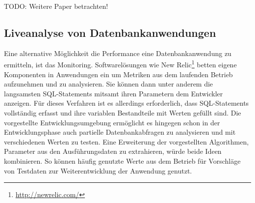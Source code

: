 TODO: Weitere Paper betrachten!

\subsection{Liveanalyse von Datenbankanwendungen}
Eine alternative Möglichkeit die Performance eine Datenbankanwendung zu ermitteln, ist das Monitoring.
Softwarelösungen wie New Relic\footnote{\url{http://newrelic.com/}} betten eigene Komponenten in Anwendungen ein um Metriken aus dem laufenden Betrieb aufzunehmen und zu analysieren.
Sie können dann unter anderem die langsamsten SQL-Statements mitsamt ihren Parametern dem Entwickler anzeigen.
Für dieses Verfahren ist es allerdings erforderlich, dass SQL-Statements vollständig erfasst und ihre variablen Bestandteile mit Werten gefüllt sind.
Die vorgestellte Entwicklungsumgebung ermöglicht es hingegen schon in der Entwicklungsphase auch partielle Datenbankabfragen zu analysieren und mit verschiedenen Werten zu testen.
Eine Erweiterung der vorgestellten Algorithmen, Parameter aus den Ausführungsdaten zu extrahieren, würde beide Ideen kombinieren.
So können häufig genutzte Werte aus dem Betrieb für Vorschläge von Testdaten zur Weiterentwicklung der Anwendung genutzt.


